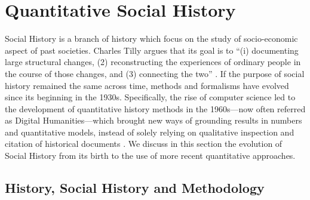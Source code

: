 \section{Quantitative Social History}\label{sec:historical-network-research}


Social History is a branch of history which focus on the study of socio-economic aspect of past societies.
Charles Tilly argues that its goal is to ``(i) documenting large structural changes, (2) reconstructing the experiences of ordinary people in the course of those changes, and (3) connecting the two'' \cite{tilly1984retrieving}.
If the purpose of social history remained the same across time, methods and formalisms have evolved since its beginning in the 1930s.
Specifically, the rise of computer science led to the development of quantitative history methods in the 1960s---now often referred as Digital Humanities---which brought new ways of grounding results in numbers and quantitative models, instead of solely relying on qualitative inspection and citation of historical documents \cite{haskinsUnderstandingQuantitativeHistory2011}.
We discuss in this section the evolution of Social History from its birth to the use of more recent quantitative approaches.






\subsection{History, Social History and Methodology}\label{subsec:history-and-social-history}

